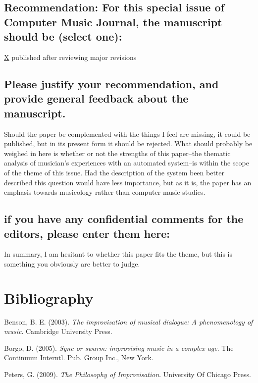 \documentclass[11pt]{article}
\begin{document}
\subsection*{Recommendation: For this special issue of Computer Music Journal, the manuscript should be (select one):}
\label{sec:orgb8daafb}
\uline{X} published after reviewing major revisions 

\subsection*{Please justify your recommendation, and provide general feedback about the manuscript.}
\label{sec:org9abbe7f}

Should the paper be complemented with the things I feel are missing, it could be published, but in its present form it should be rejected. What should probably be weighed in here is whether or not the strengths of this paper--the thematic analysis of musician's experiences with an automated system--is within the scope of the theme of this issue. Had the description of the system been better described this question would have less importance, but as it is, the paper has an emphasis towards musicology rather than computer music studies.
\subsection*{if you have any confidential comments for the editors, please enter them here:}
\label{sec:orgc596e78}
In summary, I am hesitant to whether this paper fits the theme, but this is something you obviously are better to judge.

\section*{Bibliography}
\label{sec:org6f2ecd7}
\begin{hangparas}{1.5em}{1}
\hypertarget{citeproc_bib_item_1}{Benson, B. E. (2003). \textit{The improvisation of musical dialogue: A phenomenology of music}. Cambridge University Press.}

\hypertarget{citeproc_bib_item_2}{Borgo, D. (2005). \textit{Sync or swarm: improvising music in a complex age}. The Continuum Interntl. Pub. Group Inc., New York.}

\hypertarget{citeproc_bib_item_3}{Peters, G. (2009). \textit{The Philosophy of Improvisation}. University Of Chicago Press.}\bigskip
\end{hangparas}
\end{document}

